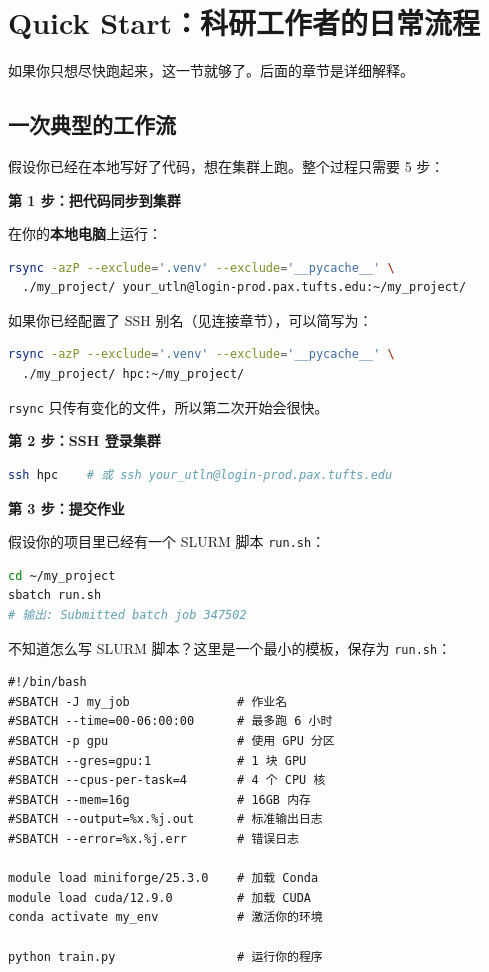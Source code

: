\section{Quick Start：科研工作者的日常流程}

如果你只想尽快跑起来，这一节就够了。后面的章节是详细解释。

\subsection{一次典型的工作流}

假设你已经在本地写好了代码，想在集群上跑。整个过程只需要 5 步：

\textbf{第 1 步：把代码同步到集群}

在你的\textbf{本地电脑}上运行：

\begin{lstlisting}[language=bash]
rsync -azP --exclude='.venv' --exclude='__pycache__' \
  ./my_project/ your_utln@login-prod.pax.tufts.edu:~/my_project/
\end{lstlisting}

如果你已经配置了 SSH 别名（见连接章节），可以简写为：

\begin{lstlisting}[language=bash]
rsync -azP --exclude='.venv' --exclude='__pycache__' \
  ./my_project/ hpc:~/my_project/
\end{lstlisting}

\texttt{rsync} 只传有变化的文件，所以第二次开始会很快。

\textbf{第 2 步：SSH 登录集群}

\begin{lstlisting}[language=bash]
ssh hpc    # 或 ssh your_utln@login-prod.pax.tufts.edu
\end{lstlisting}

\textbf{第 3 步：提交作业}

假设你的项目里已经有一个 SLURM 脚本 \texttt{run.sh}：

\begin{lstlisting}[language=bash]
cd ~/my_project
sbatch run.sh
# 输出: Submitted batch job 347502
\end{lstlisting}

不知道怎么写 SLURM 脚本？这里是一个最小的模板，保存为 \texttt{run.sh}：

\begin{lstlisting}[language=slurm]
#!/bin/bash
#SBATCH -J my_job               # 作业名
#SBATCH --time=00-06:00:00      # 最多跑 6 小时
#SBATCH -p gpu                  # 使用 GPU 分区
#SBATCH --gres=gpu:1            # 1 块 GPU
#SBATCH --cpus-per-task=4       # 4 个 CPU 核
#SBATCH --mem=16g               # 16GB 内存
#SBATCH --output=%x.%j.out      # 标准输出日志
#SBATCH --error=%x.%j.err       # 错误日志

module load miniforge/25.3.0    # 加载 Conda
module load cuda/12.9.0         # 加载 CUDA
conda activate my_env           # 激活你的环境

python train.py                 # 运行你的程序
\end{lstlisting}

